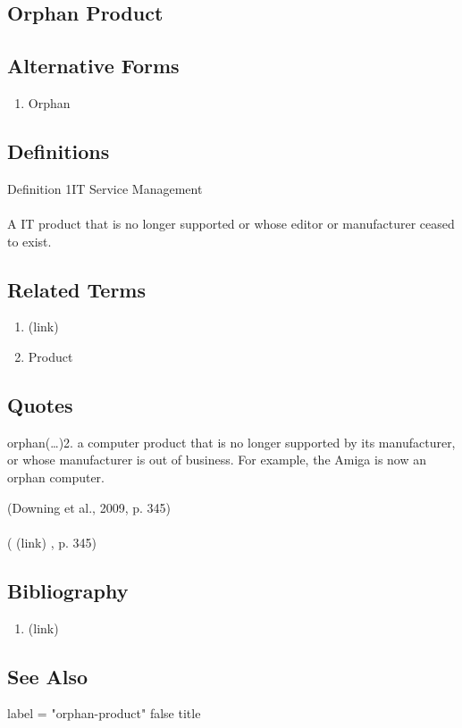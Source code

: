 \newpage \subsection*{Orphan Product } \subsection*{Alternative Forms } \begin{enumerate} \item  Orphan  \end{enumerate} \subsection*{Definitions } \begin{DIC_Def}{Definition 1IT Service Management }{} \paragraph{} A IT product that is no longer supported or whose editor or manufacturer ceased to exist.  \end{DIC_Def} \subsection*{Related Terms } \begin{enumerate} \item  (link) \href{Orphan (Dictionary Entry) }{ } \item  Product  \end{enumerate} \subsection*{Quotes } \begin{DIC_BlockQuote} orphan(\ldots)2. a computer product that is no longer supported by its manufacturer, or whose manufacturer is out of business. For example, the Amiga is now an orphan computer.  \end{DIC_BlockQuote} (Downing et al., 2009, p. 345)  \paragraph{} (  (link) \href{Downing et al., 2009 }{ } , p. 345)  \subsection*{Bibliography } \begin{enumerate} \item  (link) \href{Downing et al., 2009 }{ }   \end{enumerate} \subsection*{See Also } label = "orphan-product"  false  title  